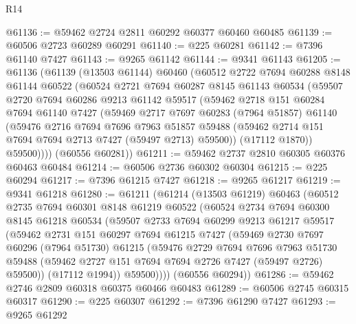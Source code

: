 \begin{lexlean}{R14}
\begin{coremodule}
@61136 := @59462 @2724 @2811 @60292 @60377 @60460 @60485
@61139 := @60506 @2723 @60289 @60291
@61140 := @225 @60281
@61142 := @7396 @61140 @7427
@61143 := @9265 @61142
@61144 := @9341 @61143
@61205 := @61136
    (@61139
      (@13503 @61144)
      @60460
      (@60512
        @2722
        @7694
        @60288
        @8148
        @61144
        @60522
        (@60524
          @2721
          @7694
          @60287
          @8145
          @61143
          @60534
          (@59507
            @2720
            @7694
            @60286
            @9213
            @61142
            @59517
            (@59462
              @2718
              @151
              @60284
              @7694
              @61140
              @7427
              (@59469
                @2717
                @7697
                @60283
                (@7964 @51857)
                @61140
                (@59476
                  @2716
                  @7694
                  @7696
                  @7963
                  @51857
                  @59488
                  (@59462 @2714 @151 @7694 @7694 @2713 @7427 (@59497 @2713) @59500))
                (@17112 @1870))
              @59500))))
      (@60556 @60281))
@61211 := @59462 @2737 @2810 @60305 @60376 @60463 @60484
@61214 := @60506 @2736 @60302 @60304
@61215 := @225 @60294
@61217 := @7396 @61215 @7427
@61218 := @9265 @61217
@61219 := @9341 @61218
@61280 := @61211
    (@61214
      (@13503 @61219)
      @60463
      (@60512
        @2735
        @7694
        @60301
        @8148
        @61219
        @60522
        (@60524
          @2734
          @7694
          @60300
          @8145
          @61218
          @60534
          (@59507
            @2733
            @7694
            @60299
            @9213
            @61217
            @59517
            (@59462
              @2731
              @151
              @60297
              @7694
              @61215
              @7427
              (@59469
                @2730
                @7697
                @60296
                (@7964 @51730)
                @61215
                (@59476
                  @2729
                  @7694
                  @7696
                  @7963
                  @51730
                  @59488
                  (@59462 @2727 @151 @7694 @7694 @2726 @7427 (@59497 @2726) @59500))
                (@17112 @1994))
              @59500))))
      (@60556 @60294))
@61286 := @59462 @2746 @2809 @60318 @60375 @60466 @60483
@61289 := @60506 @2745 @60315 @60317
@61290 := @225 @60307
@61292 := @7396 @61290 @7427
@61293 := @9265 @61292

\end{coremodule}
\end{lexlean}
